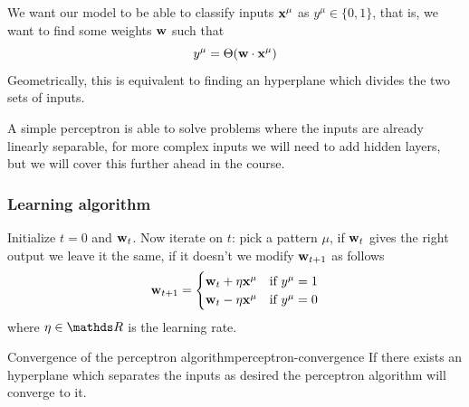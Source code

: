 \documentclass[12pt]{extarticle}
\renewcommand{\vec}[1]{\bvec{#1}}
\begin{document}
We want our model to be able to classify inputs $\vec x^\mu$ as $y^\mu \in \{0, 1\}$,
that is, we want to find some weights $\vec w$ such that
\begin{equation}
	y^\mu = \Theta(\vec w \cdot \vec x^\mu)
\end{equation}
Geometrically, this is equivalent to finding an hyperplane which divides the two sets of inputs.

A simple perceptron is able to solve problems where the inputs are already linearly separable,
for more complex inputs we will need to add hidden layers, but we will cover this further
ahead in the course.

\subsubsection{Learning algorithm}

Initialize $t = 0$ and $\vec w_t$.
Now iterate on $t$: pick a pattern $\mu$, if $\vec w_t$ gives the right output we leave it the same,
if it doesn't we modify $\vec w_{t+1}$ as follows
\begin{equation}
	\vec w_{t + 1} = \begin{cases}
		\vec w_t + \eta \vec x^\mu & \text{if } y^\mu = 1 \\
		\vec w_t - \eta \vec x^\mu & \text{if } y^\mu = 0
	\end{cases}
\end{equation}
where $\eta \in \R$ is the learning rate.

\begin{proposition}{Convergence of the perceptron algorithm}{perceptron-convergence}
	If there exists an hyperplane which separates the inputs as desired
	the perceptron algorithm will converge to it.
\end{proposition}
\end{document}
